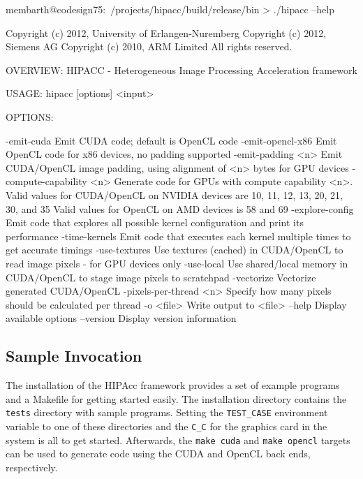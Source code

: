\begin{code}
membarth@codesign75:~/projects/hipacc/build/release/bin > ./hipacc --help

Copyright (c) 2012, University of Erlangen-Nuremberg
Copyright (c) 2012, Siemens AG
Copyright (c) 2010, ARM Limited
All rights reserved.

OVERVIEW: HIPACC - Heterogeneous Image Processing Acceleration framework

USAGE:  hipacc [options] <input>

OPTIONS:

  -emit-cuda              Emit CUDA code; default is OpenCL code
  -emit-opencl-x86        Emit OpenCL code for x86 devices, no padding supported
  -emit-padding <n>       Emit CUDA/OpenCL image padding, using alignment of <n> bytes for GPU devices
  -compute-capability <n> Generate code for GPUs with compute capability <n>.
                          Valid values for CUDA/OpenCL on NVIDIA devices are 10, 11, 12, 13, 20, 21, 30, and 35
                          Valid values for OpenCL on AMD devices is 58 and 69
  -explore-config         Emit code that explores all possible kernel configuration and print its performance
  -time-kernels           Emit code that executes each kernel multiple times to get accurate timings
  -use-textures           Use textures (cached) in CUDA/OpenCL to read image pixels - for GPU devices only
  -use-local              Use shared/local memory in CUDA/OpenCL to stage image pixels to scratchpad
  -vectorize              Vectorize generated CUDA/OpenCL
  -pixels-per-thread <n>  Specify how many pixels should be calculated per thread
  -o <file>               Write output to <file>
  --help                  Display available options
  --version               Display version information
\end{code}


\subsection{Sample Invocation}
The installation of the \ac{HIPAcc} framework provides a set of example programs and a Makefile for getting started easily.
The installation directory contains the \verb|tests| directory with sample programs.
Setting the {\tt TEST\_CASE} environment variable to one of these directories and the {\tt C\_C} for the graphics card in the system is all to get started.
Afterwards, the \verb|make cuda| and \verb|make opencl| targets can be used to generate code using the CUDA and OpenCL back ends, respectively.

